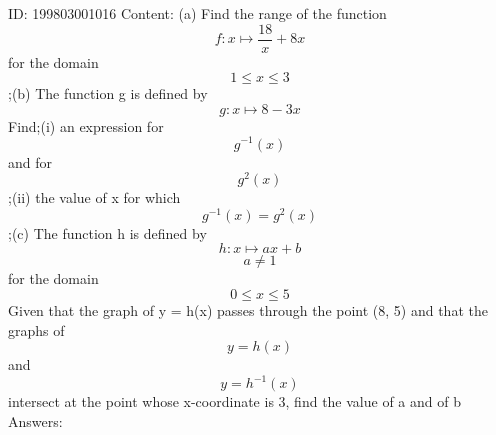 \documentclass{article}
\begin{document}
ID: 199803001016
Content:
(a)	Find the range of the function \[f:x \mapsto \frac{18}{x}+8x\] for the domain \[1\leq x \leq 3\];(b)	The function g is defined by \[g:x \mapsto 8-3x\] Find;(i)	an expression for \[g^{-1}(x)\]and for \[g^2(x)\];(ii) the value of x for which \[g^{-1}(x)=g^2(x)\];(c)	The function h is defined by \[h:x \mapsto ax+b\] \[a\neq 1\] for the domain \[0\leq x\leq 5\] Given that the graph of y = h(x) passes through the point (8, 5) and that the graphs of \[y=h(x) \]and \[y=h^{-1}(x) \]intersect at the point whose x-coordinate is 3, find the value of a and of b Answers:
\end{document}
